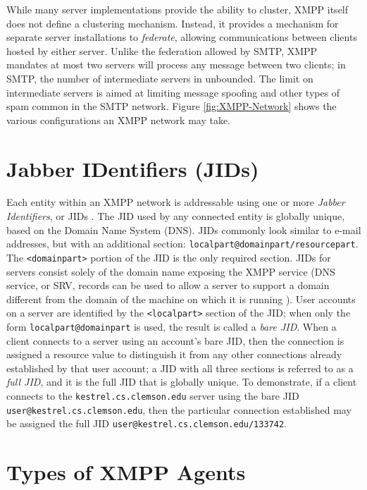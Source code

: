 While many server implementations provide the ability to cluster, XMPP itself
does not define a clustering mechanism. Instead, it provides a mechanism for
separate server installations to \textit{federate}, allowing communications
between clients hosted by either server. Unlike the federation allowed by
SMTP, XMPP mandates at most two servers will process any message between two
clients; in SMTP, the number of intermediate servers in unbounded. The limit on
intermediate servers is aimed at limiting message spoofing and other types of
spam common in the SMTP network. Figure \ref{fig:XMPP-Network} shows the 
various configurations an XMPP network may take.

\section{Jabber IDentifiers (JIDs)}
\label{sec:JIDs}

Each entity within an XMPP network is addressable using one or more
\textit{Jabber Identifiers}, or JIDs \cite{RFC3920}. The JID used by any
connected entity is globally unique, based on the Domain Name System (DNS).
JIDs commonly look similar to e-mail addresses, but with an additional section:
\texttt{localpart@domainpart/resourcepart}. The \texttt{<domainpart>} portion
of the JID is the only required section. JIDs for servers consist solely
of the domain name exposing the XMPP service (DNS service, or SRV, records
can be used to allow a server to support a domain different from the domain
of the machine on which it is running \cite{XMPP-DNS}). User accounts on a
server are identified by the \texttt{<localpart>} section of the JID; when
only the form \texttt{localpart@domainpart} is used, the result is called
a \textit{bare JID}. When a client connects to a server using an account's
bare JID, then the connection is assigned a resource value to distinguish
it from any other connections already established by that user account;
a JID with all three sections is referred to as a \textit{full JID}, and
it is the full JID that is globally unique. To demonstrate, if a client
connects to the \texttt{kestrel.cs.clemson.edu} server using the bare JID
\texttt{user@kestrel.cs.clemson.edu}, then the particular connection established
may be assigned the full JID \texttt{user@kestrel.cs.clemson.edu/133742}.

\section{Types of XMPP Agents}
\label{sec:Types-of-XMPP-Agents}

